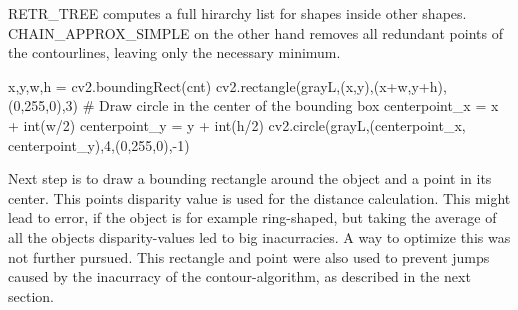 \documentclass[journal,onecolumn]{IEEEtran}
\begin{document}
RETR\_TREE computes a full hirarchy list for shapes inside other shapes. CHAIN\_APPROX\_SIMPLE on the other hand removes all redundant points of the contourlines, leaving only the necessary minimum.
\begin{python}
x,y,w,h = cv2.boundingRect(cnt)
cv2.rectangle(grayL,(x,y),(x+w,y+h),(0,255,0),3)
# Draw circle in the center of the bounding box
centerpoint_x = x + int(w/2)
centerpoint_y = y + int(h/2)
cv2.circle(grayL,(centerpoint_x, centerpoint_y),4,(0,255,0),-1)
\end{python}
\noindent Next step is to draw a bounding rectangle around the object and a point in its center. This points disparity value is used for the distance calculation. This might lead to error, if the object is for example ring-shaped, but taking the average of all the objects disparity-values led to big inacurracies. A way to optimize this was not further pursued. \newline
This rectangle and point were also used to prevent jumps caused by the inacurracy of the contour-algorithm, as described in the next section. 
\end{document}

